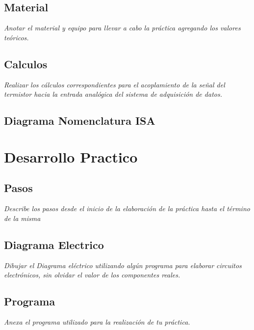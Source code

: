 \documentclass[11pt]{scrartcl}
\newcommand{\indicacion}[1]{\noindent\textit{\small #1}}
\begin{document}
\subsection{Material}

\indicacion{
Anotar el material y equipo para llevar a cabo la práctica agregando los valores teóricos.}



\subsection{Calculos}
\indicacion{
Realizar los cálculos correspondientes para el acoplamiento de la señal del termistor hacia la entrada analógica del sistema de adquisición de datos.
}


\subsection{Diagrama Nomenclatura ISA}


\section{Desarrollo Practico}

\subsection{Pasos}
\indicacion{
    Describe los pasos desde el inicio de la elaboración de la práctica hasta el término de la misma
}

\subsection{Diagrama Electrico}
\indicacion{
    Dibujar el Diagrama eléctrico utilizando algún programa para elaborar circuitos electrónicos, sin olvidar el valor de los componentes reales.
}

\subsection{Programa}

\indicacion{
    Anexa el programa utilizado para la realización de tu práctica.
}
\end{document}
